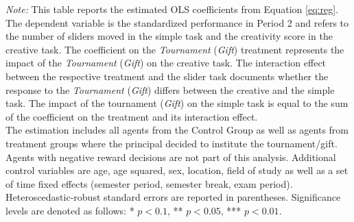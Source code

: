 \begin{table}[H]
\begin{center}
{\begin{minipage}{0.8\textwidth}
{\it Note:} This table reports the estimated OLS coefficients from Equation \ref{eq:reg}. The dependent variable is the standardized performance in Period 2 and refers to the number of sliders moved in the simple task and the creativity score in the creative task. The coefficient on the \textit{Tournament} (\textit{Gift}) treatment represents the impact of the \textit{Tournament} (\textit{Gift}) on the creative task. The interaction effect between the respective treatment and the slider task documents whether the response to the \textit{Tournament} (\textit{Gift}) differs between the creative and the simple task. The impact of the tournament (\textit{Gift}) on the simple task is equal to the sum of the coefficient on the treatment and its interaction effect.\\
The estimation includes all agents from the Control Group as well as agents from treatment groups where the principal decided to institute the tournament/gift. Agents with negative reward decisions are not part of this analysis. Additional control variables are age, age squared, sex, location, field of study as well as a set of time fixed  effects (semester period, semester break, exam period). Heteroscedastic-robust standard errors are reported in parentheses. Significance levels are denoted as follows: * $p < 0.1$, ** $p < 0.05$, *** $p < 0.01$. 
\end{minipage}}
\end{center}
\label{tab:EQ_Pooled_Results}
\end{table}
